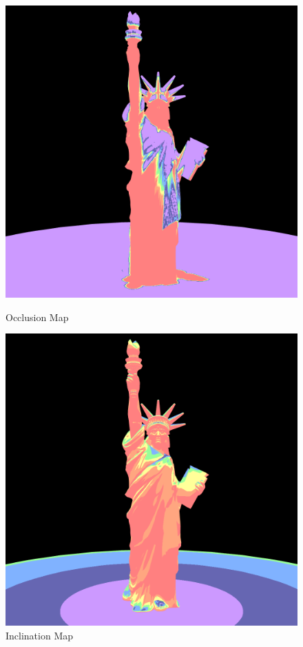 \documentclass{article}
\begin{document}
\begin{figure}[h]
  \centering
  \begin{minipage}{0.4\textwidth}
      \centering
      \includegraphics[width=\textwidth]{images/OcclusionMap.png}
      \caption{Occlusion Map}
      \label{fig:OcclusionMap}
  \end{minipage}\hfill
  \begin{minipage}{0.4\textwidth}
      \centering
      \includegraphics[width=\textwidth]{images/InclinationMap.png}
      \caption{Inclination Map}
      \label{fig:InclinationMap}
  \end{minipage}
\end{figure}
\end{document}
